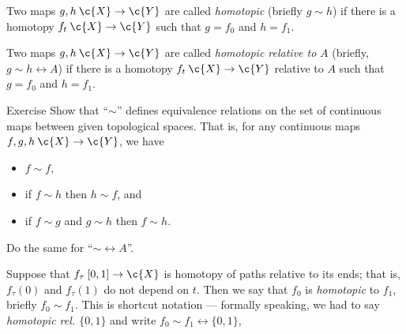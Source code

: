 Two maps $g,h\:\c{X}\to \c{Y}$ are called {}\emph{homotopic} (briefly $g\sim h$)
if there is a homotopy $f_t\:\c{X}\to \c{Y}$ such that $g=f_0$ and $h=f_1$.

Two maps $g,h\:\c{X}\to \c{Y}$ are called \emph{homotopic relative to} $A$ (briefly, $g\sim h\rel A$)
if there is a homotopy $f_t\:\c{X}\to \c{Y}$ relative to $A$ such that $g=f_0$ and $h=f_1$.

\begin{thm}{Exercise}\label{ex:hom-eq}
Show that ``$\sim$''  defines equivalence relations on the set of continuous maps between given topological spaces.
That is, for any continuous maps $f,g,h\:\c{X}\to \c{Y}$, we have 
\begin{itemize}
\item $f\sim f$, 
\item if $f\sim h$ then $h\sim f$, and
\item if $f\sim g$ and $g\sim h$ then $f\sim h$.
\end{itemize}
Do the same for ``$\sim\rel A$''.
\end{thm}

Suppose that $f_\tau\:[0,1]\to\c{X}$ is homotopy of paths relative to its ends;
that is, $f_\tau(0)$ and $f_\tau(1)$ do not depend on $t$.
Then we say that $f_0$ is \emph{homotopic} to $f_1$, briefly $f_0\sim f_1$.
This is shortcut notation --- formally speaking, we had to say \textit{homotopic rel. $\{0,1\}$} and write $f_0\sim f_1\rel{\{0,1\}}$,

